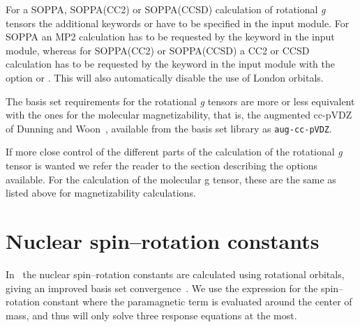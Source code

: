 For a SOPPA, SOPPA(CC2) or
SOPPA(CCSD) calculation of rotational  {\em g}
tensors the additional keywords  or  have
to be specified in the  input module. For SOPPA an MP2
calculation has to be requested by the keyword  in the
 input module, whereas for SOPPA(CC2) or
SOPPA(CCSD) a CC2 or CCSD calculation has to be requested by the
keyword  in the  input module with the  option
 or . This will also automatically disable
the use of London orbitals.


The basis set requirements for the rotational {\em g} tensors are more or
less equivalent with the ones for the molecular magnetizability,
that is, the augmented cc-pVDZ of Dunning and
Woon~\cite{thdjcp90,dewthdjcp98}, available from the basis set library
as \verb|aug-cc-pVDZ|.

If more close control of the different parts of the calculation of the
rotational {\em g}  tensor is wanted we refer the reader to the section
describing the options available. For the calculation of the molecular
g tensor, these are the same as listed above for magnetizability
calculations.

\section{Nuclear spin--rotation constants}\label{sec:spinrotasjon}

\begin{center}
\end{center}


In \dalton\ the nuclear spin--rotation
constants are calculated using
rotational orbitals, giving an improved
basis set convergence~\cite{jgkrthjcp105}. We use the
expression for the spin--rotation constant where the paramagnetic term
is evaluated around the center of mass, and thus will only solve three
response equations at the most.

